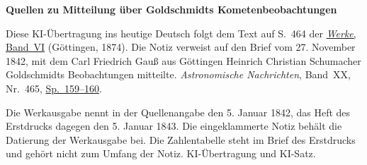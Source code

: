 \clearpage\thispagestyle{empty}
\begin{center}\textbf{Quellen zu Mitteilung über Goldschmidts Kometenbeobachtungen}\end{center}
\noindent Diese KI-Übertragung ins heutige Deutsch folgt dem Text auf S.~464 der \href{https://gdz.sub.uni-goettingen.de/id/PPN236007467}{\textit{Werke}, Band~VI} (Göttingen, 1874). Die Notiz verweist auf den Brief vom 27. November 1842, mit dem Carl Friedrich Gauß aus Göttingen Heinrich Christian Schumacher Goldschmidts Beobachtungen mitteilte. \textit{Astronomische Nachrichten}, Band~XX, Nr.~465, \href{https://api.digitale-sammlungen.de/iiif/image/v2/bsb10049445_00088/full/1800,/0/default.jpg}{Sp.~159--160}.
\par\smallskip\noindent Die Werkausgabe nennt in der Quellenangabe den 5. Januar 1842, das Heft des Erstdrucks dagegen den 5. Januar 1843. Die eingeklammerte Notiz behält die Datierung der Werkausgabe bei. Die Zahlentabelle steht im Brief des Erstdrucks und gehört nicht zum Umfang der Notiz. KI-Übertragung und KI-Satz.
\clearpage
